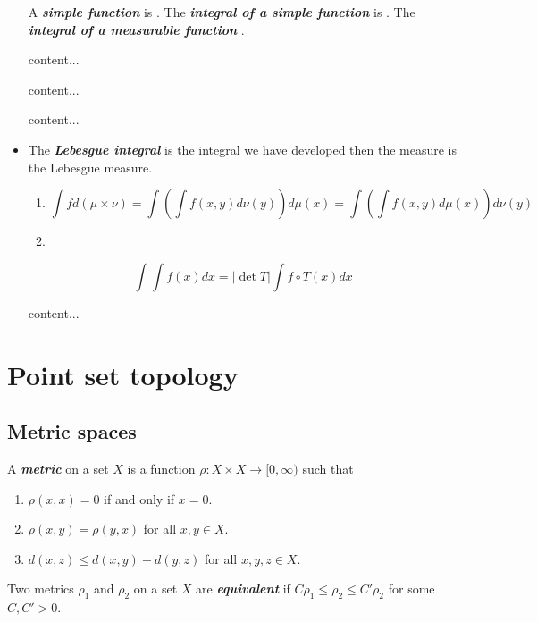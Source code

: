 \documentclass{article}
\theoremstyle{definition}
\begin{document}
\begin{itemize}
		A \textbf{\textit{simple function}} is . The \textbf{\textit{integral of a simple function}} is . The \textbf{\textit{integral of a measurable function}} .
		\begin{thm}
			content...
		\end{thm}
		\begin{thm}
			content...
		\end{thm}
		\begin{prop}
			content...
		\end{prop}
		\item The \textbf{\textit{Lebesgue integral}} is the integral we have developed then the measure is the Lebesgue measure.
		\begin{thm}\leavevmode
			\begin{enumerate}
				\item \[\int fd(\mu\times\nu)=\int\left(\int f(x,y)d\nu(y)\right)d\mu(x)=\int\left(\int f(x,y)d\mu(x)\right)d\nu(y)\]
				\item 
			\end{enumerate}
		\end{thm}
		\begin{thm}[2.44]
			\[\int \int f(x)dx=|\det T|\int f\circ T(x)dx\]
		\end{thm}
		\begin{thm}[2.47, diffeomorphisms]
			content...
		\end{thm}

		\end{itemize}

\clearpage

\section{Point set topology}
	 \subsection{Metric spaces} A \textbf{\textit{metric}} on a set $X$ is a function $\rho:X\times X\to [0,\infty)$ such that
	\begin{enumerate}
		\item $\rho(x,x)=0$ if and only if $x=0$.
		\item $\rho(x,y)=\rho(y,x)$ for all $x,y\in X$.
		\item $d(x,z)\leq d(x,y)+d(y,z)$ for all $x,y,z\in X$.
	\end{enumerate}
	Two metrics $\rho_1$ and $\rho_2$ on a set $X$ are \textbf{\textit{equivalent}} if $C\rho_1\leq\rho_2\leq C'\rho_2$ for some $C,C'>0$.
	
\end{document}
